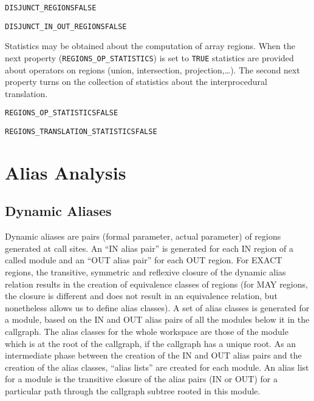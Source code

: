 \documentclass[a4paper]{report}
\newenvironment{PipsProp}{\begin{alltt}}{\end{alltt}}
\begin{document}
\begin{PipsProp}
DISJUNCT_REGIONS FALSE
\end{PipsProp}

\begin{PipsProp}
DISJUNCT_IN_OUT_REGIONS FALSE
\end{PipsProp}

Statistics may be obtained about the computation of array
regions. When the next 
property ({\tt REGIONS\_OP\_STATISTICS}) is set to {\tt TRUE} statistics are
provided about operators on regions (union, intersection,
projection,\dots). The second next property turns on the collection of
statistics about the interprocedural translation.

\begin{PipsProp}
REGIONS_OP_STATISTICS FALSE
\end{PipsProp}

\begin{PipsProp}
REGIONS_TRANSLATION_STATISTICS FALSE
\end{PipsProp}



\section{Alias Analysis}
\label{subsection-alias-analysis}

\subsection{Dynamic Aliases}
\label{subsubsection-dynamic-aliases}

Dynamic aliases are pairs (formal parameter, actual parameter) of regions
generated at call sites. An ``IN alias pair'' is generated for each IN
region of
a called module and an ``OUT alias pair'' for each OUT region. For EXACT
regions, the transitive, symmetric and reflexive closure of the dynamic
alias relation results in the creation of equivalence classes of regions
(for MAY regions, the closure is different and does not
result in an equivalence relation, but nonetheless allows us to define alias
classes). A set of alias
classes is generated for a module, based on the IN and OUT alias
pairs of all the modules below it in the callgraph. The alias classes for
the whole workspace are those of the module which is at the root of the
callgraph, if the callgraph has a unique root. As an intermediate phase
between the creation of the
IN and OUT alias pairs and the creation of the alias classes, ``alias
lists'' are created for each module. An alias list for a module is the
transitive closure of the alias pairs (IN or OUT) for a particular path
through the callgraph subtree rooted in this module.
\end{document}
